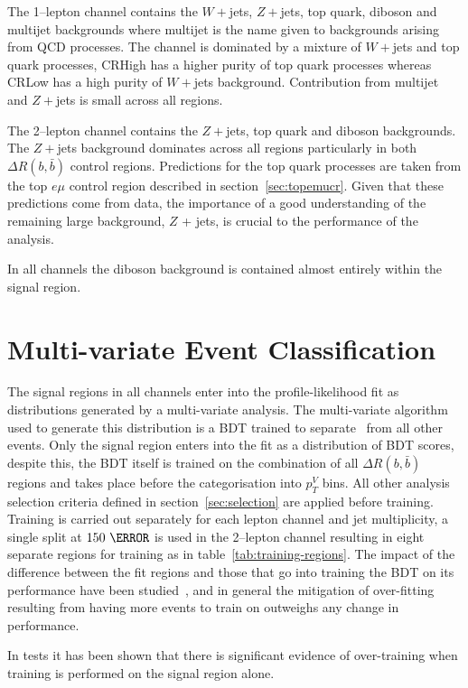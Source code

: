 The 1--lepton channel contains the $W+$jets, $Z+$jets, top quark, diboson
and multijet backgrounds where multijet is the name given to backgrounds arising
from QCD processes. The channel is dominated by a mixture of $W+$jets and top
quark processes, CRHigh has a higher purity of top quark processes whereas CRLow
has a high purity of $W+$jets background. Contribution from multijet and
$Z+$jets is small across all regions.

The 2--lepton channel contains the $Z+$jets, top quark and diboson
backgrounds. The $Z+$jets background dominates across all regions particularly
in both $\Delta R(b, \bar{b})$ control regions. Predictions for the top quark
processes are taken from the top $e \mu$ control region described in
section~\ref{sec:topemucr}. Given that these predictions come from data, the
importance of a good understanding of the remaining large background, $Z$ +
jets, is crucial to the performance of the analysis.

In all channels the diboson background is contained almost entirely within the
signal region.

\section{Multi-variate Event Classification}%
\label{sec:mva}

The signal regions in all channels enter into the profile-likelihood fit as
distributions generated by a multi-variate analysis. The multi-variate algorithm
used to generate this distribution is a BDT trained to separate \VHbb\ from all
other events. Only the signal region enters into the fit as a distribution of
BDT scores, despite this, the BDT itself is trained on the combination of all
$\Delta R(b, \bar{b})$ regions and takes place before the categorisation into
$p_T^V$ bins. All other analysis selection criteria defined in
section~\ref{sec:selection} are applied before training. Training is carried out
separately for each lepton channel and jet multiplicity, a single split at
$150~\GeV$ is used in the 2--lepton channel resulting in eight separate regions
for training as in table~\ref{tab:training-regions}. The impact of the
difference between the fit regions and those that go into training the BDT on
its performance have been studied~\cite{VHMainNote2019}, and in general the
mitigation of over-fitting resulting from having more events to train on
outweighs any change in performance.


In tests it has been shown that there is significant evidence of
over-training when training is performed on the signal region alone.

